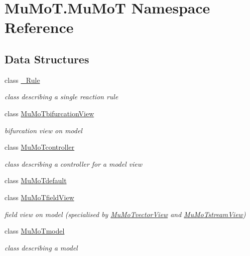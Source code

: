 \hypertarget{namespace_mu_mo_t_1_1_mu_mo_t}{}\section{Mu\+Mo\+T.\+Mu\+MoT Namespace Reference}
\label{namespace_mu_mo_t_1_1_mu_mo_t}
\subsection*{Data Structures}
\begin{DoxyCompactItemize}
\item 
class \hyperlink{class_mu_mo_t_1_1_mu_mo_t_1_1___rule}{\+\_\+\+Rule}
\begin{DoxyCompactList}\small\item\em class describing a single reaction rule \end{DoxyCompactList}\item 
class \hyperlink{class_mu_mo_t_1_1_mu_mo_t_1_1_mu_mo_tbifurcation_view}{Mu\+Mo\+Tbifurcation\+View}
\begin{DoxyCompactList}\small\item\em bifurcation view on model \end{DoxyCompactList}\item 
class \hyperlink{class_mu_mo_t_1_1_mu_mo_t_1_1_mu_mo_tcontroller}{Mu\+Mo\+Tcontroller}
\begin{DoxyCompactList}\small\item\em class describing a controller for a model view \end{DoxyCompactList}\item 
class \hyperlink{class_mu_mo_t_1_1_mu_mo_t_1_1_mu_mo_tdefault}{Mu\+Mo\+Tdefault}
\item 
class \hyperlink{class_mu_mo_t_1_1_mu_mo_t_1_1_mu_mo_tfield_view}{Mu\+Mo\+Tfield\+View}
\begin{DoxyCompactList}\small\item\em field view on model (specialised by \hyperlink{class_mu_mo_t_1_1_mu_mo_t_1_1_mu_mo_tvector_view}{Mu\+Mo\+Tvector\+View} and \hyperlink{class_mu_mo_t_1_1_mu_mo_t_1_1_mu_mo_tstream_view}{Mu\+Mo\+Tstream\+View}) \end{DoxyCompactList}\item 
class \hyperlink{class_mu_mo_t_1_1_mu_mo_t_1_1_mu_mo_tmodel}{Mu\+Mo\+Tmodel}
\begin{DoxyCompactList}\small\item\em class describing a model \end{DoxyCompactList}\item 

\end{DoxyCompactItemize}
